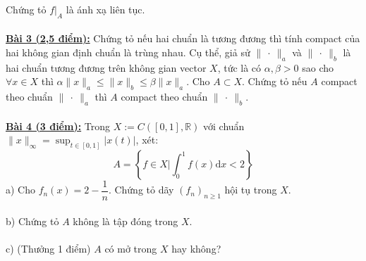 \documentclass[10pt, a4paper]{article}
\begin{document}
Chứng tỏ $f\big|_A$ là ánh xạ liên tục.\\\\
\color{red}\underline{\textbf{Bài 3 (2,5 điểm):}} \color{black}Chứng tỏ nếu hai chuẩn là tương đương thì tính compact của hai không gian định chuẩn là trùng nhau. Cụ thể, giả sử $\lVert~\cdot~\rVert_a$ và $\lVert~\cdot~\rVert_b$ là hai chuẩn tương đương trên không gian vector $X$, tức là có $\alpha,\beta>0$ sao cho $\forall x\in X$ thì $\alpha\lVert x\rVert_a\le\lVert x\rVert_b\le\beta\lVert x\rVert_a$. Cho $A\subset X$. Chứng tỏ nếu $A$ compact theo chuẩn $\lVert~\cdot~\rVert_a$ thì $A$ compact theo chuẩn $\lVert~\cdot~\rVert_b$.\\\\
\color{red}\underline{\textbf{Bài 4 (3 điểm):}} \color{black}Trong $X:=C([0,1],\mathbb R)$ với chuẩn $\lVert x\rVert_\infty=\displaystyle\sup_{t\in[0,1]}|x(t)|$, xét: $$A=\left\{f\in X\Big|\displaystyle\int_0^1f(x)\text{d}x<2\right\}$$
\color{red}a) \color{black}Cho $f_n(x)=2-\dfrac1n$. Chứng tỏ dãy $(f_n)_{n\ge1}$ hội tụ trong $X$.\\\\
\color{red}b) \color{black}Chứng tỏ $A$ không là tập đóng trong $X$.\\\\
\color{red}c) (Thưởng 1 điểm) \color{black}$A$ có mở trong $X$ hay không?

\newpage
\end{document}

